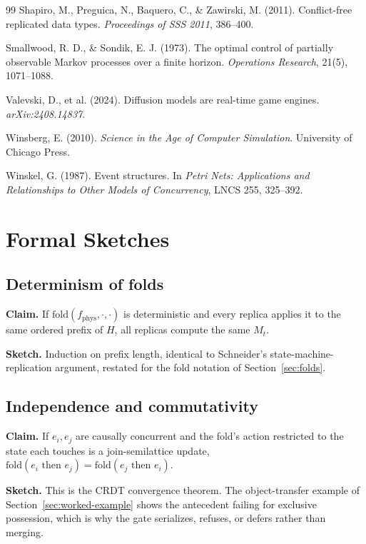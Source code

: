 \documentclass[11pt]{article}
\begin{document}
\begin{thebibliography}{99}
 Shapiro, M., Preguica, N., Baquero, C., \& Zawirski, M. (2011). Conflict-free replicated data types. \textit{Proceedings of SSS 2011}, 386--400.

 Smallwood, R. D., \& Sondik, E. J. (1973). The optimal control of partially observable Markov processes over a finite horizon. \textit{Operations Research}, 21(5), 1071--1088.

 Valevski, D., et al. (2024). Diffusion models are real-time game engines. \textit{arXiv:2408.14837}.

 Winsberg, E. (2010). \textit{Science in the Age of Computer Simulation}. University of Chicago Press.

 Winskel, G. (1987). Event structures. In \textit{Petri Nets: Applications and Relationships to Other Models of Concurrency}, LNCS 255, 325--392.

\end{thebibliography}

\appendix

\section{Formal Sketches}
\label{app:formal}

\subsection{Determinism of folds}

\textbf{Claim.} If $\mathrm{fold}(f_{\mathrm{phys}}, \cdot, \cdot)$ is deterministic and every replica applies it to the same ordered prefix of $H$, all replicas compute the same $M_t$.

\textbf{Sketch.} Induction on prefix length, identical to Schneider's state-machine-replication argument, restated for the fold notation of Section~\ref{sec:folds}.

\subsection{Independence and commutativity}

\textbf{Claim.} If $e_i, e_j$ are causally concurrent and the fold's action restricted to the state each touches is a join-semilattice update, $\mathrm{fold}(e_i \text{ then } e_j) = \mathrm{fold}(e_j \text{ then } e_i)$.

\textbf{Sketch.} This is the CRDT convergence theorem. The object-transfer example of Section~\ref{sec:worked-example} shows the antecedent failing for exclusive possession, which is why the gate serializes, refuses, or defers rather than merging.
\end{document}

